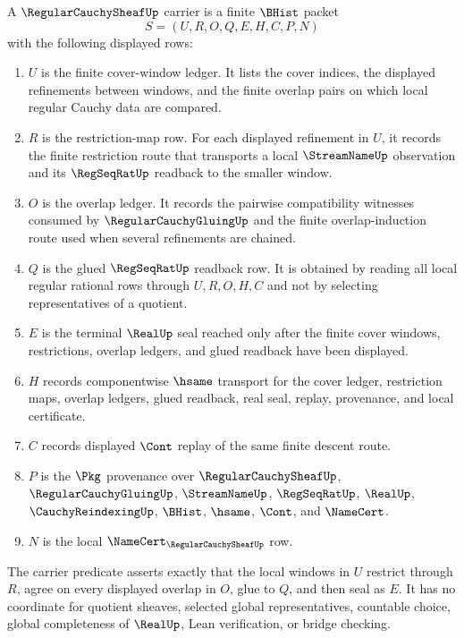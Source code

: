 \begin{definition}
\label{def:regular-cauchy-sheaf-carrier}
A $\RegularCauchySheafUp$ carrier is a finite $\BHist$ packet
$$
S=(U,R,O,Q,E,H,C,P,N)
$$
with the following displayed rows:
\begin{enumerate}
\item $U$ is the finite cover-window ledger. It lists the cover indices, the displayed refinements between windows, and the finite overlap pairs on which local regular Cauchy data are compared.
\item $R$ is the restriction-map row. For each displayed refinement in $U$, it records the finite restriction route that transports a local $\StreamNameUp$ observation and its $\RegSeqRatUp$ readback to the smaller window.
\item $O$ is the overlap ledger. It records the pairwise compatibility witnesses consumed by $\RegularCauchyGluingUp$ and the finite overlap-induction route used when several refinements are chained.
\item $Q$ is the glued $\RegSeqRatUp$ readback row. It is obtained by reading all local regular rational rows through $U,R,O,H,C$ and not by selecting representatives of a quotient.
\item $E$ is the terminal $\RealUp$ seal reached only after the finite cover windows, restrictions, overlap ledgers, and glued readback have been displayed.
\item $H$ records componentwise $\hsame$ transport for the cover ledger, restriction maps, overlap ledgers, glued readback, real seal, replay, provenance, and local certificate.
\item $C$ records displayed $\Cont$ replay of the same finite descent route.
\item $P$ is the $\Pkg$ provenance over $\RegularCauchySheafUp$, $\RegularCauchyGluingUp$, $\StreamNameUp$, $\RegSeqRatUp$, $\RealUp$, $\CauchyReindexingUp$, $\BHist$, $\hsame$, $\Cont$, and $\NameCert$.
\item $N$ is the local $\NameCert_{\RegularCauchySheafUp}$ row.
\end{enumerate}
The carrier predicate asserts exactly that the local windows in $U$ restrict through $R$, agree on every displayed overlap in $O$, glue to $Q$, and then seal as $E$. It has no coordinate for quotient sheaves, selected global representatives, countable choice, global completeness of $\RealUp$, Lean verification, or bridge checking.
\end{definition}

